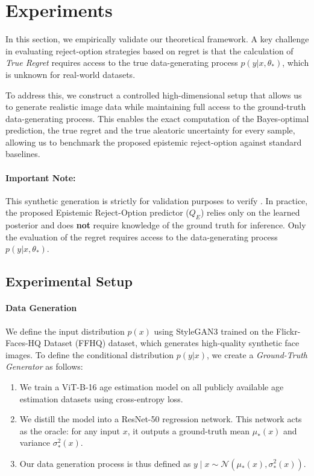 \section{Experiments}
\label{appendix:experiments}
In this section, we empirically validate our theoretical framework. A key challenge in evaluating reject-option strategies based on regret is that the calculation of \textit{True Regret} requires access to the true data-generating process $p(y|x, \theta_*)$, which is unknown for real-world datasets.

To address this, we construct a controlled high-dimensional setup that allows us to generate realistic image data while maintaining full access to the ground-truth data-generating process. This enables the exact computation of the Bayes-optimal prediction, the true regret and the true aleatoric uncertainty for every sample, allowing us to benchmark the proposed epistemic reject-option against standard baselines.

\paragraph{Important Note:} This synthetic generation is strictly for validation purposes to verify . In practice, the proposed Epistemic Reject-Option predictor ($Q_E$) relies only on the learned posterior and does \textbf{not} require knowledge of the ground truth for inference. Only the evaluation of the regret requires access to the data-generating process $p(y|x, \theta_*)$.

\subsection{Experimental Setup}
\paragraph{Data Generation} We define the input distribution $p(x)$ using StyleGAN3 \cite{Karras2021} trained on the Flickr-Faces-HQ Dataset (FFHQ) dataset, which generates high-quality synthetic face images. To define the conditional distribution $p(y|x)$, we create a \textit{Ground-Truth Generator} as follows:
\begin{enumerate}
    \item We train a ViT-B-16 age estimation model on all publicly available age estimation datasets using cross-entropy loss.
    \item We distill the model into a ResNet-50 regression network. This network acts as the oracle: for any input $x$, it outputs a ground-truth mean $\mu_*(x)$ and variance $\sigma^{2}_*(x)$.
    \item Our data generation process is thus defined as $y \mid x \sim \mathcal{N}(\mu_*(x), \sigma_*^{2}(x))$.
\end{enumerate}

